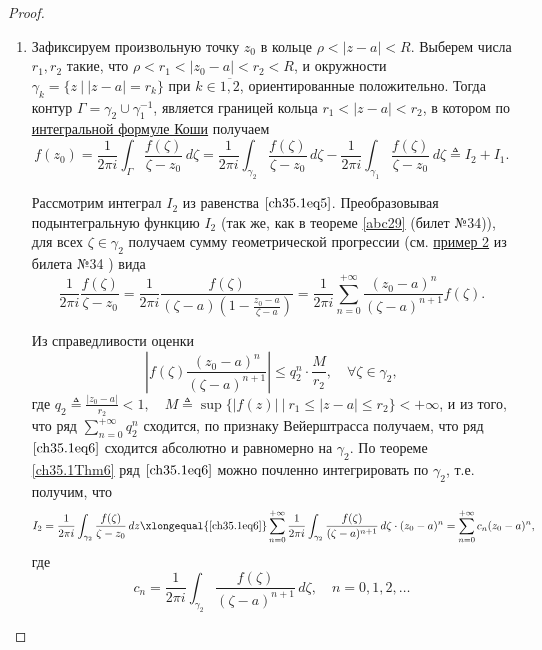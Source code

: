 \begin{leftbar}
\begin{proof}
\begin{enumerate}
\item

Зафиксируем произвольную точку $z_0$ в кольце $\rho < |z - a| < R$. Выберем числа $r_1, r_2$ такие, что 
$\rho < r_1 < |z_0 - a| < r_2 < R$, и окружности $\gamma_k = \{ z \: \big| \: |z - a| = r_k\}$ при $k \in \overline{1,2}$, ориентированные положительно. Тогда контур $\Gamma = \gamma_2 \cup \gamma_{1}^{-1}$, является границей кольца $r_1 < |z - a| < r_2$, в котором по  \hyperref[ch34thm1]{интегральной формуле Коши} получаем
\begin{equation} \label{ch35.1eq5}
f(z_0) = \frac{1}{2\pi i} \int_\Gamma \frac{f(\zeta)}{\zeta - z_0} \,d\zeta = \frac{1}{2\pi i} \int_{\gamma_2} \frac{f(\zeta)}{\zeta - z_0} \,d\zeta - \frac{1}{2\pi i} \int_{\gamma_1} \frac{f(\zeta)}{\zeta - z_0} \,d\zeta \triangleq I_2 + I_1.
\end{equation}

Рассмотрим интеграл $I_2$ из равенства $\eqref{ch35.1eq5}$. Преобразовывая подынтегральную функцию $I_2$ (так же, как в теореме \ref{abc29} (билет №34)), для всех $\zeta \in \gamma_2$ получаем сумму геометрической прогрессии (см. \hyperref[exmpl2]{пример 2} из билета №34 ) вида
\begin{equation} \label{ch35.1eq6}
\frac{1}{2\pi i} \frac{f(\zeta)}{\zeta - z_0} = \frac{1}{2\pi i} \frac{f(\zeta)}{(\zeta - a) \left( 1 - \frac{z_0 - a}{\zeta - a}\right)} = \frac{1}{2\pi i}\sum\limits_{n = 0}^{+\infty} \frac{(z_0 - a)^n}{(\zeta - a)^{n + 1}} f(\zeta).
\end{equation}

Из справедливости оценки
$$
\left| f(\zeta) \frac{(z_0 - a)^n}{(\zeta - a)^{n + 1}}\right| \le q_{2}^n \cdot \frac{M}{r_2}, \quad \forall \zeta \in \gamma_2,
$$
где $q_2 \triangleq \frac{|z_0 - a|}{r_2} < 1, \quad M \triangleq \sup \{ |f(z)| \: \big| \: r_1 \le |z - a| \le r_2\} < +\infty$, и из того, что ряд $\sum\limits_{n = 0}^{+\infty} q_{2}^n$ сходится, по признаку Вейерштрасса получаем, что ряд $\eqref{ch35.1eq6}$ сходится абсолютно и равномерно на $\gamma_2$. По теореме \ref{ch35.1Thm6}  ряд $\eqref{ch35.1eq6}$ можно почленно интегрировать по $\gamma_2$, т.е. получим, что 
\begin{equation} \label{ch35.1eq7}
I_2 = \frac{1}{2\pi i} \int_{\gamma_2} \frac{f(\zeta)}{\zeta - z_0} \,d z \xlongequal{\eqref{ch35.1eq6}} \sum\limits_{n = 0}^{+\infty} \frac{1}{2\pi i} \int_{\gamma_2} \frac{f(\zeta)}{(\zeta - a)^{n + 1}} \,d\zeta \cdot (z_0 - a)^n = \sum\limits_{n = 0}^{+\infty} c_n (z_0 - a)^n,
\end{equation}
где 
\begin{equation} \label{ch35.1eq8}
c_n = \frac{1}{2\pi i} \int_{\gamma_2}  \frac{f(\zeta)}{(\zeta - a)^{n + 1}} \,d\zeta, \quad n = 0,1,2,\ldots
\end{equation}


\end{enumerate}
\end{proof}
\end{leftbar}
